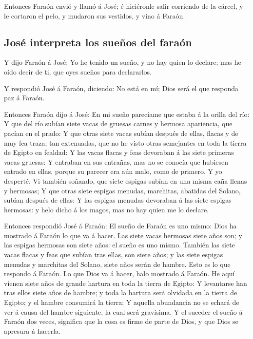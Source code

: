  Entonces Faraón envió y llamó á José; é hiciéronle salir
corriendo de la cárcel, y le cortaron el pelo, y mudaron sus vestidos, y
vino á Faraón.

\hypertarget{josuxe9-interpreta-los-sueuxf1os-del-farauxf3n}{%
\subsection{José interpreta los sueños del
faraón}\label{josuxe9-interpreta-los-sueuxf1os-del-farauxf3n}}

 Y dijo Faraón á José: Yo he tenido un sueño, y no hay
quien lo declare; mas he oído decir de ti, que oyes sueños para
declararlos.

 Y respondió José á Faraón, diciendo: No está en mí; Dios
será el que responda paz á Faraón.

 Entonces Faraón dijo á José: En mi sueño parecíame que
estaba á la orilla del río:  Y que del río subían siete
vacas de gruesas carnes y hermosa apariencia, que pacían en el prado:
 Y que otras siete vacas subían después de ellas, flacas y
de muy fea traza; tan extenuadas, que no he visto otras semejantes en
toda la tierra de Egipto en fealdad:  Y las vacas flacas y
feas devoraban á las siete primeras vacas gruesas:  Y
entraban en sus entrañas, mas no se conocía que hubiesen entrado en
ellas, porque su parecer era aún malo, como de primero. Y yo desperté.
 Vi también soñando, que siete espigas subían en una misma
caña llenas y hermosas;  Y que otras siete espigas menudas,
marchitas, abatidas del Solano, subían después de ellas:  Y
las espigas menudas devoraban á las siete espigas hermosas: y helo dicho
á los magos, mas no hay quien me lo declare.

 Entonces respondió José á Faraón: El sueño de Faraón es
uno mismo: Dios ha mostrado á Faraón lo que va á hacer. 
Las siete vacas hermosas siete años son; y las espigas hermosas son
siete años: el sueño es uno mismo.  También las siete vacas
flacas y feas que subían tras ellas, son siete años; y las siete espigas
menudas y marchitas del Solano, siete años serán de hambre.
 Esto es lo que respondo á Faraón. Lo que Dios va á hacer,
halo mostrado á Faraón.  He aquí vienen siete años de
grande hartura en toda la tierra de Egipto:  Y levantarse
han tras ellos siete años de hambre; y toda la hartura será olvidada en
la tierra de Egipto; y el hambre consumirá la tierra;  Y
aquella abundancia no se echará de ver á causa del hambre siguiente, la
cual será gravísima.  Y el suceder el sueño á Faraón dos
veces, significa que la cosa es firme de parte de Dios, y que Dios se
apresura á hacerla.

